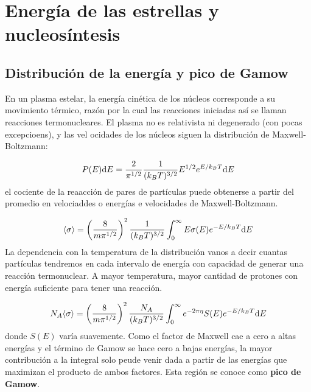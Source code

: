 
\section{Energía de las estrellas y nucleosíntesis}

\subsection{Distribución de la energía y pico de Gamow}

En un plasma estelar, la energía cinética de los núcleos corresponde a su movimiento térmico, razón por la cual las reacciones iniciadas así se llaman reacciones termonucleares. El plasma no es relativista ni degenerado (con pocas excepcioens), y las vel ocidades de los núcleos siguen la distribución de Maxwell-Boltzmann:

\begin{equation}
    P(E) \mathrm{d} E = \frac{2}{\pi^{1/2}}  \frac{1}{(k_BT)^{3/2}} E^{1/2} e^{E/k_BT}\mathrm{d} E
\end{equation}
el cociente de la reaacción de pares de partículas puede obtenerse a partir del promedio en velociaddes o energías e velocidades de Maxwell-Boltzmann. 

\begin{equation}
    \langle \sigma \rangle = \left( \frac{8}{m\pi^{1/2}} \right)^2 \frac{1}{(k_BT)^{3/2}} \int_{0}^{\infty} E \sigma (E) e^{-E/k_BT} \mathrm{d} E
\end{equation}
La dependencia con la temperatura de la distribución vanos a decir cuantas partículas tendremos en cada intervalo de energía con capacidad de generar una reacción termonuclear. A mayor temperatura, mayor cantidad de protones con energía suficiente para tener una reacción. 

\begin{equation}
    N_A \langle \sigma \rangle = \left( \frac{8}{m\pi^{1/2}} \right)^2 \frac{N_A}{(k_BT)^{3/2}} \int_{0}^{\infty} e^{-2\pi  \eta} S(E) e^{-E/k_BT} \mathrm{d} E
\end{equation}
donde $S(E)$ varía suavemente. Como el factor de Maxwell cae a cero a altas energías y el término de Gamow se hace cero a bajas energías, la mayor contribución a la integral solo peude venir dada a partir de las energías que maximizan el producto de ambos factores. Esta región se conoce como \textbf{pico de Gamow}. 


